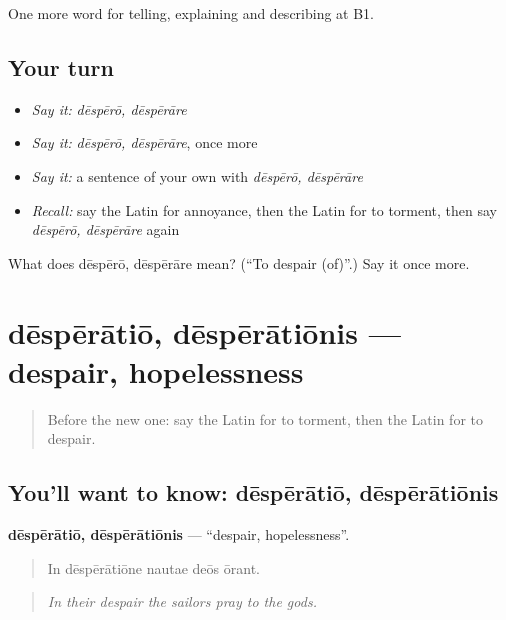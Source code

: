 \begin{grammarlens}[title={What you've built}]
One more word for telling, explaining and describing at B1.
\end{grammarlens}

\subsection*{Your turn}
\begin{itemize}
\raggedright
  \item \emph{Say it:} \emph{dēspērō, dēspērāre}
  \item \emph{Say it:} \emph{dēspērō, dēspērāre}, once more
  \item \emph{Say it:} a sentence of your own with \emph{dēspērō, dēspērāre}
  \item \emph{Recall:} say the Latin for annoyance, then the Latin for to torment, then say \emph{dēspērō, dēspērāre} again
\end{itemize}

\begin{tcolorbox}[breakable,colback=teal!4,colframe=teal!35!black,title={Before you move on}]
What does dēspērō, dēspērāre mean? (\textquotedblleft{}To despair (of)\textquotedblright{}.) Say it once more.
\end{tcolorbox}
\section[dēspērātiō, dēspērātiōnis]{dēspērātiō, dēspērātiōnis — despair, hopelessness}

\label{lesson:LA-C498-desperatio}



\begin{quote}
Before the new one: say the Latin for to torment, then the Latin for to despair.
\end{quote}

\subsection*{You'll want to know: dēspērātiō, dēspērātiōnis}
\textbf{dēspērātiō, dēspērātiōnis} — \textquotedblleft{}despair, hopelessness\textquotedblright{}.

\begin{quote}
In dēspērātiōne nautae deōs ōrant.
\end{quote}

\begin{quote}
\emph{In their despair the sailors pray to the gods.}
\end{quote}

